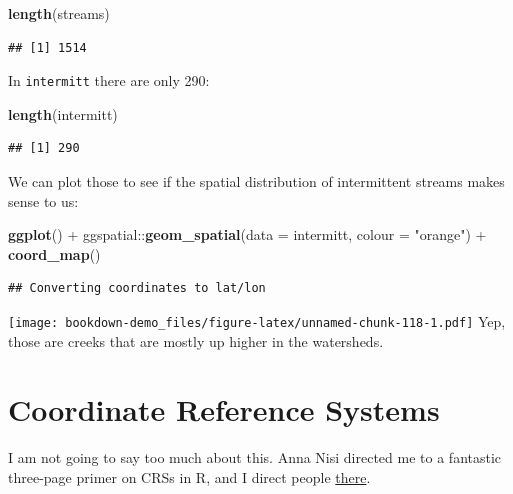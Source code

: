 \documentclass[]{book}
\newenvironment{Shaded}{\begin{snugshade}}{\end{snugshade}}
\newcommand{\KeywordTok}[1]{\textcolor[rgb]{0.13,0.29,0.53}{\textbf{{#1}}}}
\newcommand{\DataTypeTok}[1]{\textcolor[rgb]{0.13,0.29,0.53}{{#1}}}
\newcommand{\StringTok}[1]{\textcolor[rgb]{0.31,0.60,0.02}{{#1}}}
\newcommand{\NormalTok}[1]{{#1}}
\theoremstyle{definition}
\theoremstyle{definition}
\theoremstyle{remark}
\begin{document}
\begin{Shaded}
\begin{Highlighting}[]
\KeywordTok{length}\NormalTok{(streams)}
\end{Highlighting}
\end{Shaded}

\begin{verbatim}
## [1] 1514
\end{verbatim}

In \texttt{intermitt} there are only 290:

\begin{Shaded}
\begin{Highlighting}[]
\KeywordTok{length}\NormalTok{(intermitt)}
\end{Highlighting}
\end{Shaded}

\begin{verbatim}
## [1] 290
\end{verbatim}

We can plot those to see if the spatial distribution of intermittent
streams makes sense to us:

\begin{Shaded}
\begin{Highlighting}[]
\KeywordTok{ggplot}\NormalTok{() +}
\StringTok{  }\NormalTok{ggspatial::}\KeywordTok{geom_spatial}\NormalTok{(}\DataTypeTok{data =} \NormalTok{intermitt, }\DataTypeTok{colour =} \StringTok{"orange"}\NormalTok{) +}
\StringTok{  }\KeywordTok{coord_map}\NormalTok{()}
\end{Highlighting}
\end{Shaded}

\begin{verbatim}
## Converting coordinates to lat/lon
\end{verbatim}

\texttt{[image: bookdown-demo\_files/figure-latex/unnamed-chunk-118-1.pdf]}
Yep, those are creeks that are mostly up higher in the watersheds.

\section{Coordinate Reference
Systems}\label{coordinate-reference-systems}

I am not going to say too much about this. Anna Nisi directed me to a
fantastic three-page primer on CRSs in R, and I direct people
\href{https://www.nceas.ucsb.edu/~frazier/RSpatialGuides/OverviewCoordinateReferenceSystems.pdf}{there}.
\end{document}
